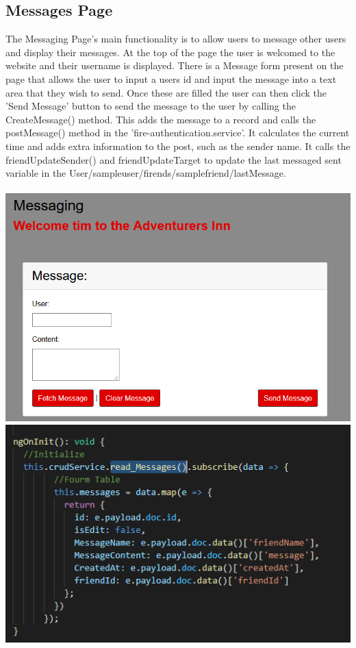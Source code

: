 \subsection{Messages Page}
The Messaging Page's main functionality is to allow users to message other users and display their messages. At the top of the page the user is welcomed to the website and their username is displayed. There is a Message form present on the page that allows the user to input a users id and input the message into a text area that they wish to send. Once these are filled the user can then click the 'Send Message' button to send the message to the user by calling the CreateMessage() method. This adds the message to a record and calls the postMessage() method in the 'fire-authentication.service'. It calculates the current time and adds extra information to the post, such as the sender name. It calls the friendUpdateSender() and friendUpdateTarget to update the last messaged sent variable in the User/sampleuser/firends/samplefriend/lastMessage.\\\\
\includegraphics[scale=0.3]{./img/MessagingInput.png} 
\includegraphics[scale=0.3]{./img/MessageMapping.png} 
